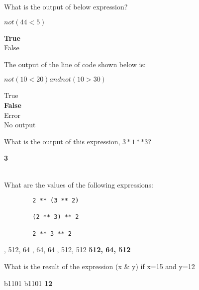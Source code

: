 \documentclass{exam}
\begin{document}
\begin{questions}
     \question What is the output of below expression?

           $not(44 < 5)$

     \begin{oneparchoices}
         \choice \textbf{True} \\
         \choice False
     \end{oneparchoices}

     \question The output of the line of code shown below is:

            $not(10 < 20) and not(10 > 30)$

     \begin{oneparchoices}
        \choice True \\
        \choice \textbf{False}\\
        \choice Error\\
        \choice No output
     \end{oneparchoices}

     \question What is the output of this expression, $3 * 1 ** 3$?

     \begin{oneparchoices}
         \choice \textbf{3} \\
          \\

     \end{oneparchoices}

     \question What are the values of the following expressions:

     \begin{verbatim}
        2 ** (3 ** 2)
        
        (2 ** 3) ** 2
        
        2 ** 3 ** 2
     \end{verbatim}

     \begin{oneparchoices}
         , 512, 64
         , 64, 64
         , 512, 512
         \choice \textbf{512, 64, 512}
     \end{oneparchoices}

     \question What is the result of the expression (x \& y) if x=15 and y=12

     \begin{oneparchoices}
         \choice b1101
         \choice b1101
         \choice \textbf{12}
     \end{oneparchoices}


\end{questions}
\end{document}
